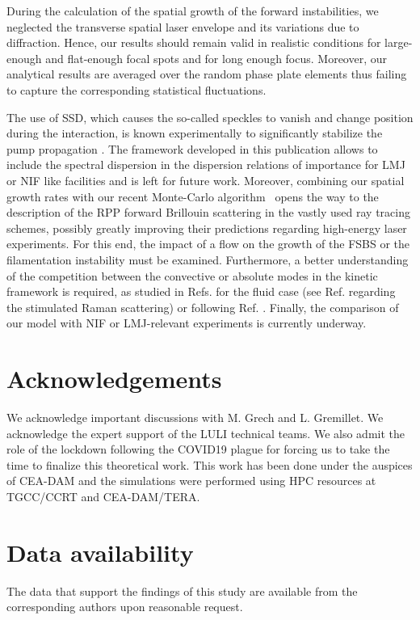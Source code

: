 \documentclass[
 reprint,
 superscriptaddress,
 amsmath,amssymb,
 aps,
]{revtex4-1}
\begin{document}
During the calculation of the spatial growth of the forward instabilities, we neglected the transverse spatial laser envelope and its variations due to diffraction. Hence, our results should remain valid in realistic conditions for large-enough and flat-enough focal spots and for long enough focus. Moreover,  our analytical results are averaged over the random phase plate elements thus failing to capture the corresponding statistical fluctuations. 

The use of SSD, which  causes the so-called speckles to vanish and change position during the interaction, is known  experimentally to significantly stabilize the pump propagation \cite[]{Berger_1995}. The framework developed in this publication allows to include the spectral dispersion in the dispersion relations of importance for LMJ or NIF like facilities  and is left for future work. Moreover, 
combining our spatial growth rates with our recent Monte-Carlo algorithm~\cite[]{POP_Debayle_2019}  opens the way to the description of the RPP forward Brillouin scattering   in the vastly used ray tracing schemes, possibly greatly improving their predictions regarding high-energy laser experiments. For this end, the impact of a flow on the growth of the FSBS or the filamentation instability must be examined. 
Furthermore, a better  understanding of the competition between the convective or absolute modes in the kinetic framework is required,   as studied  in Refs. \cite[]{phd-Grech,PRL_Grech_2009} for the fluid case  (see Ref. \cite[]{POP_Grismayer_2004}  regarding the stimulated Raman scattering) or  following   Ref. \cite[]{PR_Hall_68}.
Finally, the comparison of our model with NIF or LMJ-relevant experiments is currently underway. 

\section*{Acknowledgements}
We acknowledge important discussions with M. Grech and L. Gremillet. We acknowledge the expert support of the LULI technical teams. We also admit the role of the lockdown following the COVID19 plague for forcing us to take the time to finalize this theoretical work. This work has been done under the auspices of CEA-DAM  and the simulations were performed using HPC resources at TGCC/CCRT and CEA-DAM/TERA.

\section*{Data availability}
The data that support the findings of this study are available from the corresponding authors upon reasonable request.
\end{document}
